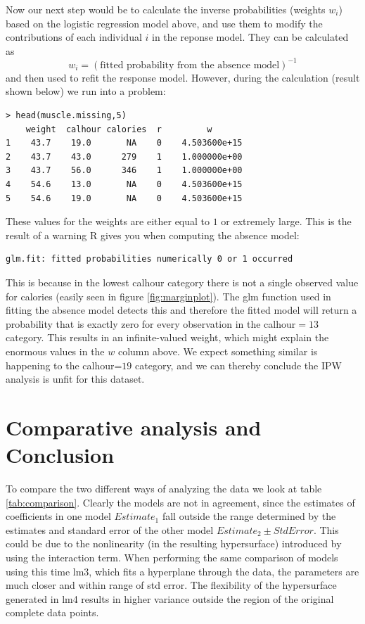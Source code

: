 \documentclass[11pt, a4paper]{article}
\begin{document}
Now our next step would be to calculate the inverse probabilities
(weights $w_i$) based on the logistic regression model above, and use
them to modify the contributions of each individual $i$ in the reponse
model. They can be calculated as
\[w_i=(\text{fitted probability from the absence model})^{-1}\]
and then used to refit the response model. However, during the
calculation (result shown below) we run into a problem:
\begin{verbatim}
> head(muscle.missing,5)
    weight  calhour calories  r         w
1    43.7    19.0       NA    0    4.503600e+15
2    43.7    43.0      279    1    1.000000e+00
3    43.7    56.0      346    1    1.000000e+00
4    54.6    13.0       NA    0    4.503600e+15
5    54.6    19.0       NA    0    4.503600e+15
\end{verbatim}
These values for the weights are either equal to $1$ or extremely
large. This is the result of a warning R gives you when computing the
absence model:
\begin{verbatim}
glm.fit: fitted probabilities numerically 0 or 1 occurred
\end{verbatim}
This is because in the lowest calhour category there is not a single
observed value for calories (easily seen in figure
\ref{fig:marginplot}). The glm function used in fitting the absence
model detects this and therefore the fitted model will return a
probability that is exactly zero for every observation in the
calhour$=13$ category. This results in an infinite-valued weight,
which might explain the enormous values in the $w$ column above. We
expect something similar is happening to the calhour=$19$ category,
and we can thereby conclude the IPW analysis is unfit for this
dataset.

\section{Comparative analysis and Conclusion}
To compare the two different ways of analyzing the data we look at
table \ref{tab:comparison}. Clearly the models are not in agreement,
since the estimates of coefficients in one model $Estimate_1$ fall
outside the range determined by the estimates and standard error of
the other model $Estimate_2 \pm Std Error$. This could be due to the
nonlinearity (in the resulting hypersurface) introduced by using the
interaction term. When performing the same comparison of models using
this time lm3, which fits a hyperplane through the data, the
parameters are much closer and within range of std error. The
flexibility of the hypersurface generated in lm4 results in higher
variance outside the region of the original complete data points.
\end{document}
